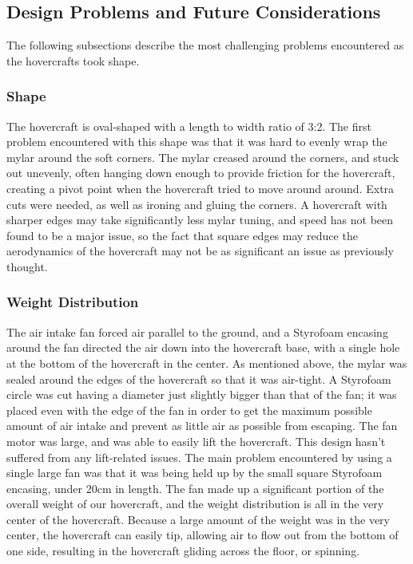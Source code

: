 \begin{minipage}{6.5in}
\begin{minipage}{6.5in}
\subsection{Design Problems and Future Considerations}
The following subsections describe the most challenging problems encountered as the hovercrafts took shape.  

\subsubsection{Shape}
The hovercraft is oval-shaped with a length to width ratio of 3:2. The first problem encountered with this shape was that it was hard to evenly wrap the mylar around the soft corners. The mylar creased around the corners, and stuck out unevenly, often hanging down enough to provide friction for the hovercraft, creating a pivot point when the hovercraft tried to move around around.  Extra cuts were needed, as well as ironing and gluing the corners.  A hovercraft with sharper edges may take significantly less mylar tuning, and speed has not been found to be a major issue, so the fact that square edges may reduce the aerodynamics of the hovercraft may not be as significant an issue as previously thought.

\subsubsection{Weight Distribution}
The air intake fan forced air parallel to the ground, and a Styrofoam encasing around the fan directed the air down into the hovercraft base, with a single hole at the bottom of the hovercraft in the center. As mentioned above, the mylar was sealed around the edges of the hovercraft so that it was air-tight. A Styrofoam circle was cut having a diameter just slightly bigger than that of the fan; it was placed even with the edge of the fan in order to get the maximum possible amount of air intake and prevent as little air as possible from escaping.  The fan motor was large, and was able to easily lift the hovercraft.  This design hasn't suffered from any lift-related issues. The main problem encountered by using a single large fan was that it was being held up by the small square Styrofoam encasing, under 20cm in length. The fan made up a significant portion of the overall weight of our hovercraft, and the weight distribution is all in the very center of the hovercraft. Because a large amount of the weight was in the very center, the hovercraft can easily tip, allowing air to flow out from the bottom of one side, resulting in the hovercraft gliding across the floor, or spinning.


\end{minipage}
\end{minipage}
